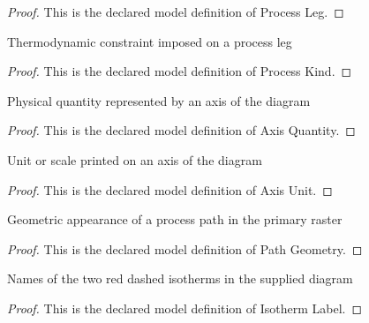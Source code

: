 \begin{proof}
  This is the declared model definition of Process Leg.
\end{proof}
\begin{definition}
  \label{def:physics:phyx-mini-0476:phyxminiproblems-problemphyxmini0476-processkind}
  Thermodynamic constraint imposed on a process leg
\end{definition}
\begin{proof}
  This is the declared model definition of Process Kind.
\end{proof}
\begin{definition}
  \label{def:physics:phyx-mini-0476:phyxminiproblems-problemphyxmini0476-axisquantity}
  Physical quantity represented by an axis of the diagram
\end{definition}
\begin{proof}
  This is the declared model definition of Axis Quantity.
\end{proof}
\begin{definition}
  \label{def:physics:phyx-mini-0476:phyxminiproblems-problemphyxmini0476-axisunit}
  Unit or scale printed on an axis of the diagram
\end{definition}
\begin{proof}
  This is the declared model definition of Axis Unit.
\end{proof}
\begin{definition}
  \label{def:physics:phyx-mini-0476:phyxminiproblems-problemphyxmini0476-pathgeometry}
  Geometric appearance of a process path in the primary raster
\end{definition}
\begin{proof}
  This is the declared model definition of Path Geometry.
\end{proof}
\begin{definition}
  \label{def:physics:phyx-mini-0476:phyxminiproblems-problemphyxmini0476-isothermlabel}
  Names of the two red dashed isotherms in the supplied diagram
\end{definition}
\begin{proof}
  This is the declared model definition of Isotherm Label.
\end{proof}
